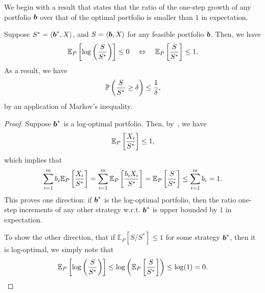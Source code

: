     We begin with a result that states that the ratio of the one-step growth of any portfolio $\boldsymbol{b}$ over that of the optimal portfolio is smaller than $1$ in expectation. 
    \begin{corollary}
        \label{corollary:optimal-portfolio-2} Suppose $S^* = \langle \boldsymbol{b}^*, X\rangle$, and $S = \langle \boldsymbol{b}, X \rangle$ for any feasible portfolio $\boldsymbol{b}$. Then, we have 
        \begin{align}
            \mathbb{E}_P\left[ \log \left( \frac{S}{S^*} \right) \right] \leq 0 \quad \Leftrightarrow \quad \mathbb{E}_P \left[ \frac{S}{S^*} \right] \leq 1. 
        \end{align}
        As a result, we have 
        \begin{align}
            \mathbb{P}\left( \frac{S}{S^*} \geq \delta \right) \leq \frac{1}{\delta}, 
        \end{align}
        by an application of Markov's inequality. 
    \end{corollary}
    \begin{proof}
        Suppose $\boldsymbol{b}^*$ is a log-optimal portfolio. Then, by~, we have 
        \begin{align}
            \mathbb{E}_P\left[ \frac{X_i}{S^*} \right] \leq 1, 
        \end{align}
        which implies that 
        \begin{align}
            \sum_{i=1}^m b_i \mathbb{E}_P\left[ \frac{X_i}{S^*} \right] = \sum_{i=1}^m  \mathbb{E}_P\left[ \frac{ b_i X_i}{S^*} \right] = \mathbb{E}_P \left[ \frac{S}{S^*} \right] \leq \sum_{i=1}^m b_i = 1. 
        \end{align}
        This proves one direction: if $\boldsymbol{b}^*$ is the log-optimal portfolio, then the ratio one-step increments of any other strategy w.r.t. $\boldsymbol{b}^*$ is upper bounded by $1$ in expectation. 

        To show the other direction, that if $\mathbb{E}_P[S/S^*] \leq 1$ for some strategy $\boldsymbol{b}^*$, then it is log-optimal, we simply note that 
        \begin{align}
            \mathbb{E}_P\left[ \log \left( \frac{S}{S^*} \right) \right] \leq \log \left( \mathbb{E}_P\left[ \frac{S}{S^*} \right] \right) \leq \log(1) = 0. 
        \end{align}
    \end{proof}

